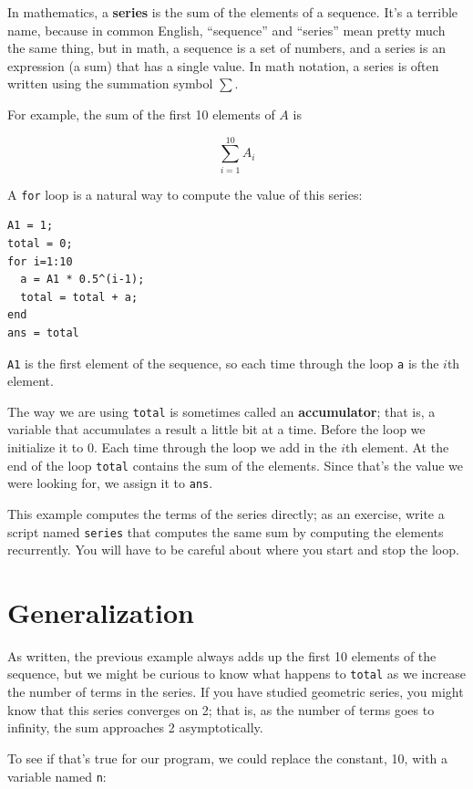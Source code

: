 \documentclass{book}
\begin{document}
In mathematics, a {\bf series} is the sum of the elements of
a sequence. It's a terrible name, because in common English,
``sequence'' and ``series'' mean pretty much the same thing, but in
math, a sequence is a set of numbers, and a series is an expression
(a sum) that has a single value. In math notation, a series
is often written using the summation symbol $\sum$.

For example, the sum of the first 10 elements of $A$ is

\[ \sum_{i=1}^{10} A_i \]

A {\tt for} loop is a natural way to compute the value of this
series:

\begin{verbatim}
A1 = 1;
total = 0;
for i=1:10
  a = A1 * 0.5^(i-1);
  total = total + a;
end
ans = total
\end{verbatim}

{\tt A1} is the first element of the sequence, so each time
through the loop {\tt a} is the $i$th element. 

The way we are using {\tt total} is sometimes called an {\bf
accumulator}; that is, a variable that accumulates a result a little
bit at a time. Before the loop we initialize it to 0. Each time
through the loop we add in the $i$th element. At the end of the loop
{\tt total} contains the sum of the elements. Since that's the value
we were looking for, we assign it to {\tt ans}.

\begin{ex}
This example computes the terms of the series directly; as
an exercise, write a script named {\tt series} that computes
the same sum by computing the elements recurrently. You will
have to be careful about where you start and stop the loop.
\end{ex}


\section{Generalization}

As written, the previous example always adds up the first 10
elements of the sequence, but we might be curious to know what
happens to {\tt total} as we increase the
number of terms in the series. If you have studied geometric
series, you might know that this series converges on 2; that is,
as the number of terms goes to infinity, the sum approaches
2 asymptotically.

To see if that's true for our program, we could replace the
constant, 10, with a variable named {\tt n}:
\end{document}
